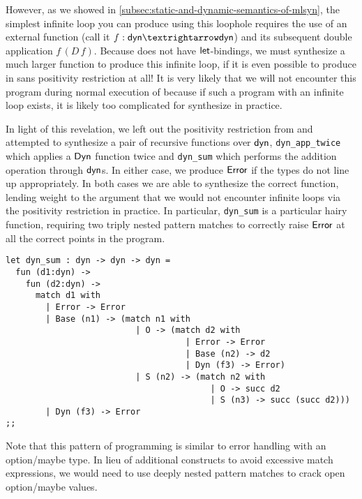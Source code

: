 However, as we showed in \autoref{subsec:static-and-dynamic-semantics-of-mlsyn}, the simplest infinite loop you can produce using this loophole requires the use of an external function (call it $f : \mdyn → \mdyn$) and its subsequent double application $f\,(D\,f)$.
Because \mlsyn{} does not have $\mathsf{let}$-bindings, we must synthesize a much larger function to produce this infinite loop, if it is even possible to produce in \mlsyn{} sans positivity restriction at all!
It is very likely that we will not encounter this program during normal execution of \myth{} because if such a program with an infinite loop exists, it is likely too complicated for \myth{} synthesize in practice.

In light of this revelation, we left out the positivity restriction from \myth{} and attempted to synthesize a pair of recursive functions over $\mathsf{dyn}$, \texttt{dyn\_app\_twice} which applies a $\mathsf{Dyn}$ function twice and \texttt{dyn\_sum} which performs the addition operation through $\mathsf{dyn}$s.
In either case, we produce $\mathsf{Error}$ if the types do not line up appropriately.
In both cases we are able to synthesize the correct function, lending weight to the argument that we would not encounter infinite loops via the positivity restriction in practice.
In particular, \texttt{dyn\_sum} is a particular hairy function, requiring two triply nested pattern matches to correctly raise $\mathsf{Error}$ at all the correct points in the program.

\begin{center}
  \begin{minipage}{0.75\textwidth}
    \begin{lstlisting}
let dyn_sum : dyn -> dyn -> dyn =
  fun (d1:dyn) ->
    fun (d2:dyn) ->
      match d1 with
        | Error -> Error
        | Base (n1) -> (match n1 with
                          | O -> (match d2 with
                                    | Error -> Error
                                    | Base (n2) -> d2
                                    | Dyn (f3) -> Error)
                          | S (n2) -> (match n2 with
                                         | O -> succ d2
                                         | S (n3) -> succ (succ d2)))
        | Dyn (f3) -> Error
;;
    \end{lstlisting}
  \end{minipage}
\end{center}

Note that this pattern of programming is similar to error handling with an option/maybe type.
In lieu of additional constructs to avoid excessive match expressions, we would need to use deeply nested pattern matches to crack open option/maybe values.

